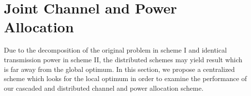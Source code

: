 \documentclass[times]{ettauth}
\theoremstyle{mytheoremstyle}
\theoremstyle{mytheoremstyle}
\theoremstyle{mytheoremstyle}
\begin{document}




\section{Joint Channel and Power Allocation}
Due to the decomposition of the original problem in scheme I and identical transmission power in scheme II, the distributed schemes may yield result which is far away from the global optimum.
In this section, we propose a centralized scheme which looks for the local optimum in order to examine the performance of our cascaded and distributed channel and power allocation scheme.
\end{document}
